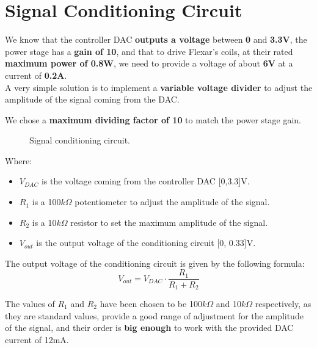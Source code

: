 \section{Signal Conditioning Circuit}
\label{Signal_Conditioning_Circuit}
We know that the controller DAC \textbf{outputs a voltage} between \textbf{0} and \textbf{3.3V}, the power stage has a \textbf{gain of 10}, and that to drive Flexar's coils, at their rated \textbf{maximum power of 0.8W}, we need to provide a voltage of about \textbf{6V} at a current of \textbf{0.2A}. \\
A very simple solution is to implement a \textbf{variable voltage divider} to adjust the amplitude of the signal coming from the DAC.

\begin{samepage}
    We chose a \textbf{maximum dividing factor of 10} to match the power stage gain.
    \nopagebreak

    \begin{figure}[H]
        \centering
        \resizebox{.5\linewidth}{!}{}
        \caption{Signal conditioning circuit.}
        \label{fig:cond_circuit}
    \end{figure}
    \nopagebreak

    Where:
    \nopagebreak

    \begin{itemize}
        \item $V_{DAC}$ is the voltage coming from the controller DAC [0,3.3]V.
        \item $R_1$ is a 100$k\Omega$ potentiometer to adjust the amplitude of the signal.
        \item $R_2$ is a 10$k\Omega$ resistor to set the maximum amplitude of the signal.
        \item $V_{out}$ is the output voltage of the conditioning circuit [0, 0.33]V.
    \end{itemize}
\end{samepage}

The output voltage of the conditioning circuit is given by the following formula:
\begin{equation}
    V_{out} = V_{DAC} \cdot \frac{R_1}{R_1 + R_2}
\end{equation}

The values of $R_1$ and $R_2$ have been chosen to be 100$k\Omega$ and 10$k\Omega$ respectively, as they are standard values, provide a good range of adjustment for the amplitude of the signal, and their order is \textbf{big enough} to work with the provided DAC current of 12mA.